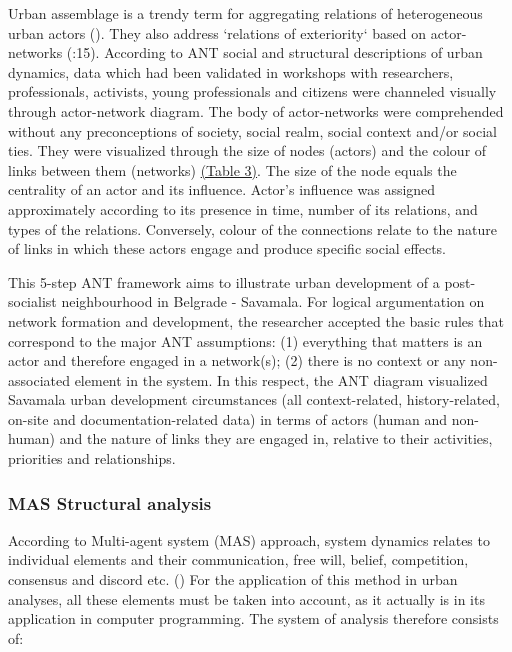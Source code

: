 \documentclass[11pt]{report}
\begin{document}
\begin{enumerate}
Urban assemblage is a trendy term for aggregating relations of heterogeneous urban actors (\cite{Muniesa et al. 2007}). They also address `relations of exteriority` based on actor-networks (\cite{Farías 2011}:15).
According to ANT social and structural descriptions of urban dynamics, data which had been validated in workshops with researchers, professionals, activists, young professionals and citizens were channeled visually through actor-network diagram. The body of actor-networks were comprehended without any preconceptions of society, social realm, social context and/or social ties. They were visualized through the size of nodes (actors) and the colour of links between them (networks) \href{ref}{(Table 3)}. The size of the node equals the centrality of an actor and its influence. Actor’s influence was assigned approximately according to its presence in time, number of its relations, and types of the relations. Conversely, colour of the connections relate to the nature of links in which these actors engage and produce specific social effects.
\end{enumerate}

This 5-step ANT framework aims to illustrate urban development of a post-socialist neighbourhood in Belgrade - Savamala. For logical argumentation on network formation and development, the researcher accepted the basic rules that correspond to the major ANT assumptions:
(1) everything that matters is an actor and therefore engaged in a network(s);
(2) there is no context or any non-associated element in the system. In this respect, the ANT diagram visualized Savamala urban development circumstances (all context-related, history-related, on-site and documentation-related data) in terms of actors (human and non-human) and the nature of links they are engaged in, relative to their activities, priorities and relationships.


\subsubsection{MAS Structural analysis}

According to Multi-agent system (MAS) approach, system dynamics relates to individual elements and their communication, free will, belief, competition, consensus and discord etc. (\cite{Ferber 1999})
For the application of this method in urban analyses, all these elements must be taken into account, as it actually is in its application in computer programming. The system of analysis therefore consists of:
\end{document}
